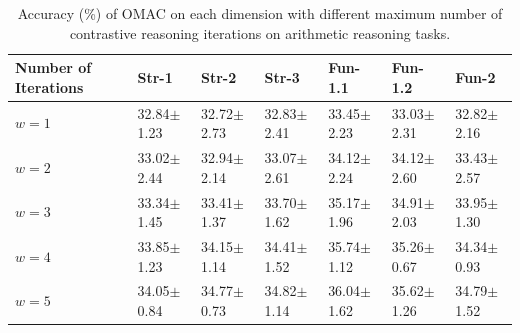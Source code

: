 \begin{table}[ht]\footnotesize
  \centering
  \begin{threeparttable}
    \captionsetup{width=\textwidth}
    \caption{Accuracy (\%) of OMAC on each dimension with different maximum number of contrastive reasoning iterations on arithmetic reasoning tasks.}
    \label{tab:iter_num}


    \begin{minipage}{0.4795\textwidth}
    \begin{tabular}{%
        p{2.6cm}<{\centering}
        p{1.4cm}<{\centering}
        p{1.4cm}<{\centering}
        p{1.4cm}<{\centering}
        p{1.4cm}<{\centering}
        p{1.4cm}<{\centering}
        p{1.4cm}<{\centering}}
      \toprule
      Number of Iterations & Str-1\scriptsize & Str-2\scriptsize & Str-3\scriptsize
      & Fun-1.1\scriptsize & Fun-1.2\scriptsize & Fun-2 \\
      \midrule
    $w=1$
        & 32.84\tiny{$\pm$1.23} & 32.72\tiny{$\pm$2.73}
        & 32.83\tiny{$\pm$2.41} & 33.45\tiny{$\pm$2.23}
        & 33.03\tiny{$\pm$2.31} & 32.82\tiny{$\pm$2.16} \\
    $w=2$
        & 33.02\tiny{$\pm$2.44} & 32.94\tiny{$\pm$2.14}
        & 33.07\tiny{$\pm$2.61} & 34.12\tiny{$\pm$2.24}
        & 34.12\tiny{$\pm$2.60} & 33.43\tiny{$\pm$2.57} \\
    $w=3$
        & {33.34}\tiny{$\pm$1.45} & {33.41}\tiny{$\pm$1.37}
        & {33.70}\tiny{$\pm$1.62} & {35.17}\tiny{$\pm$1.96}
        & {34.91}\tiny{$\pm$2.03} & {33.95}\tiny{$\pm$1.30} \\
    $w=4$
        & 33.85\tiny{$\pm$1.23} & 34.15\tiny{$\pm$1.14}
        & 34.41\tiny{$\pm$1.52} & 35.74\tiny{$\pm$1.12}
        & 35.26\tiny{$\pm$0.67} & 34.34\tiny{$\pm$0.93} \\
    $w=5$
        & 34.05\tiny{$\pm$0.84} & 34.77\tiny{$\pm$0.73}
        & 34.82\tiny{$\pm$1.14} & 36.04\tiny{$\pm$1.62}
        & 35.62\tiny{$\pm$1.26} & 34.79\tiny{$\pm$1.52} \\
      \bottomrule
    \end{tabular}
    \end{minipage}

    

  \end{threeparttable}
\end{table}